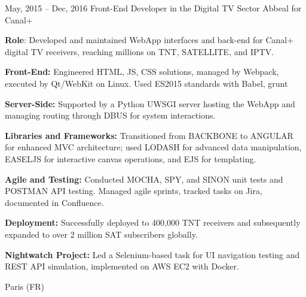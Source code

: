 \documentclass[
  a4paper,
   maincolor=cvblue,
   sectioncolor=cvblue,
   sidebarwidth=0.323\paperwidth,
]{fortysecondscv}
\begin{document}
\begin{cvtableNew}
  \cvitemRightNew
    {May, 2015 – Dec, 2016} %
    {Front-End Developer in the Digital TV Sector} %
    {Abbeal for Canal+} %
    {
      \vspace{-0.4pt} %
      \fontsize{10.8pt}{12pt}\selectfont %
      \textbf{Role}: Developed and maintained WebApp interfaces and back-end for Canal+ digital TV receivers, reaching millions on TNT, SATELLITE, and IPTV.\par
      \vspace{4pt}
      \textbf{Front-End:} Engineered HTML, JS, CSS solutions, managed by Webpack, executed by Qt/WebKit on Linux. Used ES2015 standards with Babel, grunt\par
      \vspace{4pt}
      \textbf{Server-Side:} Supported by a Python UWSGI server hosting the WebApp and managing routing through DBUS for system interactions.\par
      \vspace{4pt}
      \textbf{Libraries and Frameworks:} Transitioned from BACKBONE to ANGULAR for enhanced MVC architecture; used LODASH for advanced data manipulation, EASELJS for interactive canvas operations, and EJS for templating.\par
      \vspace{4pt}
      \textbf{Agile and Testing:} Conducted MOCHA, SPY, and SINON unit tests and POSTMAN API testing. Managed agile sprints, tracked tasks on Jira, documented in Confluence.\par
      \vspace{4pt}
      \textbf{Deployment:} Successfully deployed to 400,000 TNT receivers and subsequently expanded to over 2 million SAT subscribers globally.\par
      \vspace{4pt}
      \textbf{Nightwatch Project:} Led a Selenium-based task for UI navigation testing and REST API simulation, implemented on AWS EC2 with Docker.\par
      \vspace{4pt} %
    }
    {Paris (FR)} %


    \vspace{1.18mm} %


\end{cvtableNew}
\end{document}
